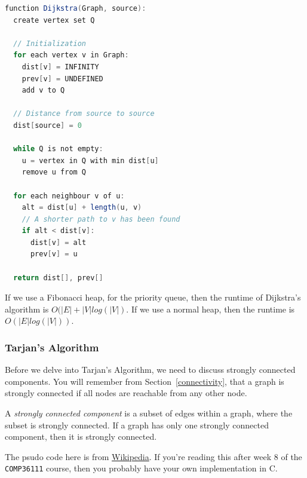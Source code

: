 
\begin{lstlisting}[language=java,
                  caption=Dijkstra's algorithm (from Wikipedia),
                  label=lst:dijkstra,
                  captionpos=b]
function Dijkstra(Graph, source):
  create vertex set Q

  // Initialization
  for each vertex v in Graph:
    dist[v] = INFINITY
    prev[v] = UNDEFINED
    add v to Q

  // Distance from source to source
  dist[source] = 0

  while Q is not empty:
    u = vertex in Q with min dist[u]
    remove u from Q 

  for each neighbour v of u:
    alt = dist[u] + length(u, v)
    // A shorter path to v has been found
    if alt < dist[v]:
      dist[v] = alt 
      prev[v] = u 

  return dist[], prev[]
\end{lstlisting}

If we use a Fibonacci heap, for the priority queue, then the runtime of
Dijkstra's algorithm is $O(|E| + |V|log(|V|)$. If we use a normal heap, then the
runtime is $O(|E|log(|V|))$.

\subsubsection{Tarjan's Algorithm}

Before we delve into Tarjan's Algorithm, we need to discuss strongly connected
components. You will remember from Section~\ref{connectivity}, that a graph is
strongly connected if all nodes are reachable from any other node.

A \textit{strongly connected component} is a subset of edges within a graph,
where the subset is strongly connected. If a graph has only one strongly
connected component, then it is strongly connected.

The psudo code here is from
\href{https://en.wikipedia.org/wiki/Tarjan%27s_strongly_connected_components_algorithm}{Wikipedia}.
If you're reading this after week 8 of the \texttt{COMP36111} course, then you
probably have your own implementation in C.

